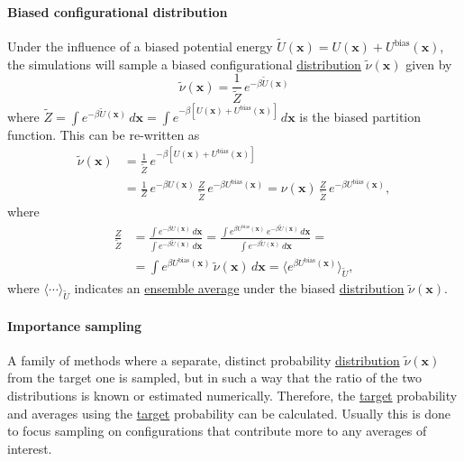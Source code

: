 \documentclass[9pt,review]{livecoms}
\newcommand{\vx}{\mathbf{x}}
\begin{document}
\hypertarget{ref:BiasedDist} {\paragraph{Biased configurational distribution}}
Under the influence of a biased potential energy $\tilde{U}(\vx) =  U(\vx) + U^\mathrm{bias}(\vx)$, the simulations will sample a biased configurational \hyperlink{ref:Distribution} {distribution} $\tilde{\nu}(\vx)$ given by
\begin{equation}
\label{eq:biased_configurational distribution}
\tilde{\nu}(\vx) = \frac{1}{\tilde{Z}} \, e^{-\beta \tilde{U}(\vx)}
\end{equation}
where $\tilde{Z} = \int e^{-\beta \tilde{U}(\vx)} \, d\vx = \int e^{-\beta\left [ U(\vx) + U^\mathrm{bias}(\vx) \right]} \, d\vx$ is the biased partition function. 
This can be re-written as 
\begin{align}
\label{eq:biased_x_distribtion_rewritten}
\tilde{\nu}(\vx) & = 
\frac{1}{\tilde{Z}} \, e^{-\beta\left [ U(\vx) + U^\mathrm{bias}(\vx) \right]} 
\nonumber \\ 
& =
\frac{1}{Z} \, e^{-\beta U(\vx)} \, \frac{Z}{\tilde{Z}} \, e^{-\beta U^\mathrm{bias}(\vx)} =
\nu(\vx) \, \frac{Z}{\tilde{Z}} \, e^{-\beta U^\mathrm{bias}(\vx)}, 
\end{align}
where 
\begin{align}
\label{eq:fraction_of_partition_functions}
\frac{Z}{\tilde{Z}} & = 
\frac{\int e^{-\beta U(\vx)} \, d\vx} {\int e^{-\beta \tilde{U}(\vx)} \, d\vx} = 
\frac{\int  e^{\beta U^\mathrm{bias}(\vx)} \, e^{-\beta \tilde{U}(\vx)} \, d\vx} {\int e^{-\beta \tilde{U}(\vx)} \, d\vx} = 
\nonumber \\ 
& =
\int  e^{\beta U^\mathrm{bias}(\vx)} \, \tilde{\nu}(\vx) \, d\vx =  
\langle e^{\beta U^\mathrm{bias}(\vx)} \rangle_{\tilde U},
\end{align}
where $\langle \cdots \rangle_{\tilde U}$ indicates an \hyperlink{ref:ensemble_average} {ensemble average} under the biased \hyperlink{ref:Distribution} {distribution} $\tilde{\nu}(\vx)$. 


\hypertarget{ref:IS} {\paragraph{Importance sampling}}
\label{sec:importance_sampling} A family of methods where a separate, distinct probability \hyperlink{ref:Distribution} {distribution} $\tilde\nu(\vx)$ from the target one is sampled, but in such a way that the ratio of the two distributions is known or estimated numerically. Therefore, the \hyperlink{ref:targetdist} {target} probability and averages using the \hyperlink{ref:targetdist} {target} probability can be calculated.  Usually this is done to focus sampling on configurations that contribute more to any averages of interest.
\end{document}
